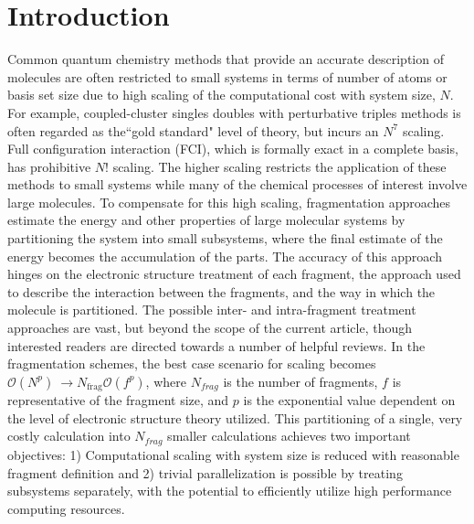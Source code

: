 \section{Introduction}
 Common quantum chemistry methods that provide an accurate description of molecules are often restricted to small systems in terms of number of atoms or basis set size due to high scaling of the computational cost with system size, $N$. 
For example, coupled-cluster singles doubles with perturbative triples methods is often regarded as the``gold standard" level of theory, but incurs an $N^7$ scaling. Full configuration interaction (FCI), which is formally exact in a complete basis, has prohibitive $N!$ scaling.
The higher scaling restricts the application of these methods to small systems while many of the chemical processes of interest involve large molecules.
To compensate for this high scaling, fragmentation approaches estimate the energy and other properties of large molecular systems by partitioning the system into small subsystems, where the final estimate of the energy becomes the accumulation of the parts.
The accuracy of this approach hinges on the electronic structure treatment of each fragment, the approach used to describe the interaction between the fragments, and the way in which the molecule is partitioned.
The possible inter- and intra-fragment treatment approaches are vast, but beyond the scope of the current article, though interested readers are directed towards a number of helpful reviews.\autocite{Herbert2019,gordon_fragmentation_2012}
In the fragmentation schemes, the best case scenario for scaling becomes $\mathcal{O}(N^p)\ \rightarrow N_{\textrm{frag}} \mathcal{O}(f^p)$,
where $N_{frag}$ is the number of fragments, $f$ is representative of the fragment size, and $p$ is the exponential value dependent on the level of electronic structure theory utilized.\autocite{Herbert2019,hasegawa_fragment-based_2013}
This partitioning of a single, very costly calculation into $N_{frag}$ smaller calculations achieves two important objectives:
1) Computational scaling with system size is reduced with reasonable fragment definition and
2) trivial parallelization is possible by treating subsystems separately, with the potential to efficiently utilize high performance computing resources. 
